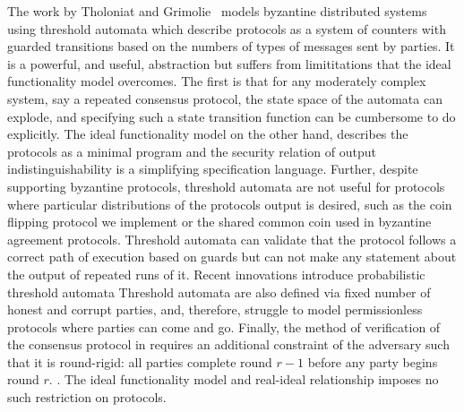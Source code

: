 The work by Tholoniat and Grimolie~\cite{tholoniat2022formal} models byzantine distributed systems using threshold automata which describe protocols as a system of counters with guarded transitions based on the numbers of types of messages sent by parties.
It is a powerful, and useful, abstraction but suffers from limititations that the ideal functionality model overcomes.
The first is that for any moderately complex system, say a repeated consensus protocol, the state space of the automata can explode, and specifying such a state transition function can be cumbersome to do explicitly. 
The ideal functionality model on the other hand, describes the protocols as a minimal program and the security relation of output indistinguishability is a simplifying specification language.
Further, despite supporting byzantine protocols, threshold automata are not useful for protocols where particular distributions of the protocols output is desired, such as the coin flipping protocol we implement or the shared common coin used in byzantine agreement protocols.
Threshold automata can validate that the protocol follows a correct path of execution based on guards but can not make any statement about the output of repeated runs of it.
Recent innovations introduce probabilistic threshold automata 
Threshold automata are also defined via fixed number of honest and corrupt parties, and, therefore, struggle to model permissionless protocols where parties can come and go.
Finally, the method of verification of the consensus protocol in \cite{tholoniate2022formal} requires an additional constraint of the adversary such that it is round-rigid: all parties complete round $r-1$ before any party begins round $r$. .
The ideal functionality model and real-ideal relationship imposes no such restriction on protocols.



